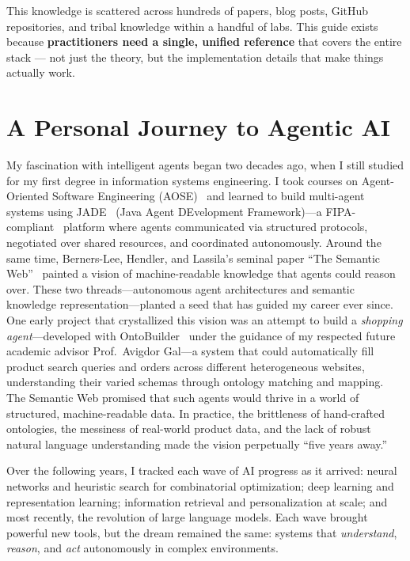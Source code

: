 \documentclass[11pt,a4paper,openany]{book}
\begin{document}
This knowledge is scattered across hundreds of papers, blog posts, GitHub repositories, and tribal knowledge within a handful of labs. This guide exists because \textbf{practitioners need a single, unified reference} that covers the entire stack --- not just the theory, but the implementation details that make things actually work.

\section*{A Personal Journey to Agentic AI}
\label{a-personal-journey-to-agentic-ai}

My fascination with intelligent agents began two decades ago, when I still studied for my first degree in information systems engineering. I took courses on Agent-Oriented Software Engineering (AOSE)~\cite{wooldridge2000gaia} and learned to build multi-agent systems using JADE~\cite{bellifemine2007jade} (Java Agent DEvelopment Framework)---a FIPA-compliant~\cite{fipa2002acl} platform where agents communicated via structured protocols, negotiated over shared resources, and coordinated autonomously. Around the same time, Berners-Lee, Hendler, and Lassila’s seminal paper ``The Semantic Web''~\cite{bernerslee2001semantic} painted a vision of machine-readable knowledge that agents could reason over. These two threads---autonomous agent architectures and semantic knowledge representation---planted a seed that has guided my career ever since. One early project that crystallized this vision was an attempt to build a \emph{shopping agent}---developed with OntoBuilder~\cite{gal2006ontobuilder} under the guidance of my respected future academic advisor Prof.~Avigdor Gal---a system that could automatically fill product search queries and orders across different heterogeneous websites, understanding their varied schemas through ontology matching and mapping. The Semantic Web promised that such agents would thrive in a world of structured, machine-readable data. In practice, the brittleness of hand-crafted ontologies, the messiness of real-world product data, and the lack of robust natural language understanding made the vision perpetually ``five years away.''

Over the following years, I tracked each wave of AI progress as it arrived: neural networks and heuristic search for combinatorial optimization; deep learning and representation learning; information retrieval and personalization at scale; and most recently, the revolution of large language models. Each wave brought powerful new tools, but the dream remained the same: systems that \emph{understand}, \emph{reason}, and \emph{act} autonomously in complex environments.
\end{document}
